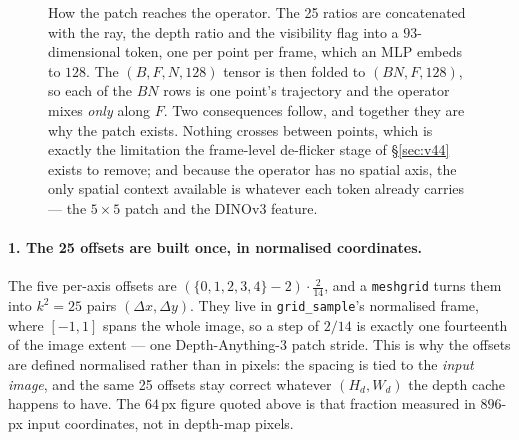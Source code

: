 \documentclass[11pt,a4paper]{article}
\begin{document}
\begin{figure}[h]
\caption{How the patch reaches the operator. The 25 ratios are concatenated with the ray, the depth
ratio and the visibility flag into a $93$-dimensional token, one per point per frame, which an MLP
embeds to $128$. The $(B,F,N,128)$ tensor is then folded to $(BN,F,128)$, so each of the $BN$ rows is
one point's trajectory and the operator mixes \emph{only} along $F$. Two consequences follow, and
together they are why the patch exists. Nothing crosses between points, which is exactly the
limitation the frame-level de-flicker stage of \S\ref{sec:v44} exists to remove; and because the
operator has no spatial axis, the only spatial context available is whatever each token already
carries --- the $5{\times}5$ patch and the DINOv3 feature.}
\label{fig:depth-patch-route}
\end{figure}


\paragraph{1. The 25 offsets are built once, in normalised coordinates.} The five per-axis offsets
are $(\{0,1,2,3,4\}-2)\cdot\tfrac{2}{14}$, and a \texttt{meshgrid} turns them into $k^2=25$ pairs
$(\Delta x,\Delta y)$. They live in \texttt{grid\_sample}'s normalised frame, where $[-1,1]$ spans
the whole image, so a step of $2/14$ is exactly one fourteenth of the image extent --- one
Depth-Anything-3 patch stride. This is why the offsets are defined normalised rather than in pixels:
the spacing is tied to the \emph{input image}, and the same 25 offsets stay correct whatever
$(H_d,W_d)$ the depth cache happens to have. The $64$\,px figure quoted above is that fraction
measured in $896$-px input coordinates, not in depth-map pixels.
\end{document}
